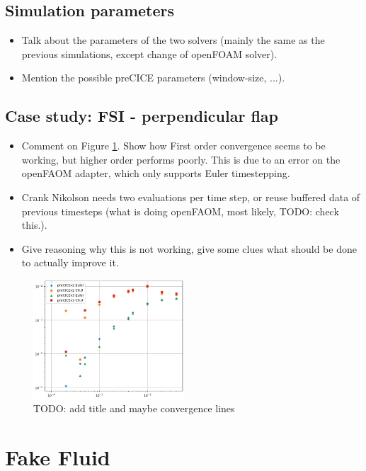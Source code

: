 \documentclass[
  english,        %
  font=times,     %
  onecolumn,      %
]{tumarticle}
\begin{document}
\subsection{Simulation parameters}
    \begin{itemize}
    \item Talk about the parameters of the two solvers (mainly the same as the previous simulations, except change of openFOAM solver). 
    \item Mention the possible preCICE parameters (window-size, ...).
    \end{itemize} 

\subsection{Case study: FSI - perpendicular flap}
\begin{itemize}
    \item Comment on Figure \ref{fig:coupled_v2_v3}. Show how First order convergence seems to be working, but higher order performs poorly. This is due to an error on the openFAOM adapter, which only supports Euler timestepping.
    \item Crank Nikolson needs two evaluations per time step, or reuse buffered data of previous timesteps (what is doing openFAOM, most likely, TODO: check this.).
    \item Give reasoning why this is not working, give some clues what should be done to actually improve it.
\end{itemize}


\begin{figure}[!ht]
    \centering
    \includegraphics[width=0.5\textwidth]{resources/coupled_v2_v3_results.png}
    \caption{TODO: add title and maybe convergence lines}
    \label{fig:coupled_v2_v3}
\end{figure}

\section{Fake Fluid}
\end{document}
